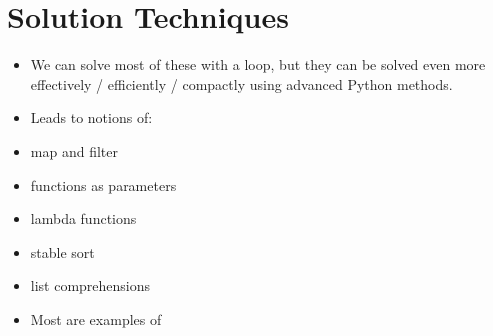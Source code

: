 \documentclass[letterpaper,10pt,english]{sphinxmanual}
\begin{document}
\section{Solution Techniques}
\label{\detokenize{lecture_notes/lec24_functional:solution-techniques}}\begin{itemize}
\item {} 
We can solve most of these with a  loop, but they can be
solved even more effectively / efficiently / compactly using
advanced Python methods.

\item {} 
Leads to notions of:

\end{itemize}
\begin{itemize}
\item {} 
map and filter

\item {} 
functions as parameters

\item {} 
lambda functions

\item {} 
stable sort

\item {} 
list comprehensions

\end{itemize}
\begin{itemize}
\item {} 
Most are examples of 

\end{itemize}
\end{document}
